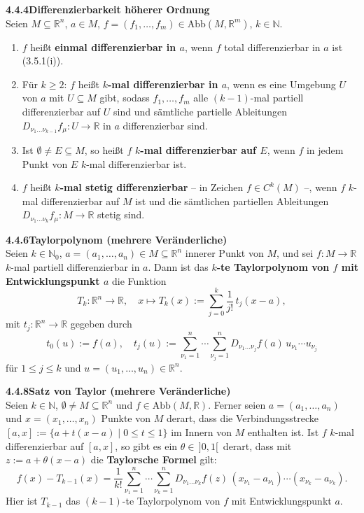 \documentclass[a4paper,12pt]{article}
\newcommand{\gentry}[3]{%
  \noindent\textbf{#1\quad #2}\nopagebreak\\[0.2em]
  #3\par\smallskip
}
\begin{document}
\gentry{4.4.4}{Differenzierbarkeit höherer Ordnung}{%
  Seien $M \subseteq \mathbb{R}^n$, $a \in M$, $f = (f_1, \ldots, f_m) \in \mathrm{Abb}(M, \mathbb{R}^m)$,
  $k \in \mathbb{N}$.
  \begin{enumerate}[label=(\roman*),topsep=2pt,itemsep=1pt]
    \item $f$ heißt \textbf{einmal differenzierbar in $a$}, wenn $f$ total differenzierbar in $a$
          ist (3.5.1(i)).
    \item Für $k \geq 2$: $f$ heißt \textbf{$k$-mal differenzierbar in $a$}, wenn es eine
          Umgebung $U$ von $a$ mit $U \subseteq M$ gibt, sodass $f_1, \ldots, f_m$ alle
          $(k-1)$-mal partiell differenzierbar auf $U$ sind und sämtliche partielle Ableitungen
          $D_{\nu_1 \ldots \nu_{k-1}} f_\mu: U \to \mathbb{R}$ in $a$ differenzierbar sind.
    \item Ist $\emptyset \neq E \subseteq M$, so heißt $f$ \textbf{$k$-mal differenzierbar auf $E$},
          wenn $f$ in jedem Punkt von $E$ $k$-mal differenzierbar ist.
    \item $f$ heißt \textbf{$k$-mal stetig differenzierbar} -- in Zeichen $f \in C^k(M)$ --,
          wenn $f$ $k$-mal differenzierbar auf $M$ ist und die sämtlichen partiellen Ableitungen
          $D_{\nu_1 \ldots \nu_k} f_\mu: M \to \mathbb{R}$ stetig sind.
  \end{enumerate}
}

\gentry{4.4.6}{Taylorpolynom (mehrere Veränderliche)}{%
  Seien $k \in \mathbb{N}_0$, $a = (a_1, \ldots, a_n) \in M \subseteq \mathbb{R}^n$ innerer Punkt
  von $M$, und sei $f: M \to \mathbb{R}$ $k$-mal partiell differenzierbar in $a$. Dann ist das
  \textbf{$k$-te Taylorpolynom von $f$ mit Entwicklungspunkt $a$} die Funktion
  \[
    T_k: \mathbb{R}^n \to \mathbb{R}, \quad x \mapsto T_k(x) := \sum_{j=0}^{k} \frac{1}{j!}\,t_j(x-a),
  \]
  mit $t_j: \mathbb{R}^n \to \mathbb{R}$ gegeben durch
  \[
    t_0(u) := f(a), \quad
    t_j(u) := \sum_{\nu_1=1}^{n} \cdots \sum_{\nu_j=1}^{n} D_{\nu_1 \ldots \nu_j} f(a)\,u_{\nu_1} \cdots u_{\nu_j}
  \]
  für $1 \leq j \leq k$ und $u = (u_1, \ldots, u_n) \in \mathbb{R}^n$.
}

\gentry{4.4.8}{Satz von Taylor (mehrere Veränderliche)}{%
  Seien $k \in \mathbb{N}$, $\emptyset \neq M \subseteq \mathbb{R}^n$ und $f \in \mathrm{Abb}(M, \mathbb{R})$.
  Ferner seien $a = (a_1, \ldots, a_n)$ und $x = (x_1, \ldots, x_n)$ Punkte von $M$ derart, dass
  die Verbindungsstrecke $[a, x] := \{a + t(x-a) \mid 0 \leq t \leq 1\}$ im Innern von $M$
  enthalten ist. Ist $f$ $k$-mal differenzierbar auf $[a, x]$, so gibt es ein $\theta \in \,]0, 1[\,$
  derart, dass mit $z := a + \theta(x-a)$ die \textbf{Taylorsche Formel} gilt:
  \[
    f(x) - T_{k-1}(x) = \frac{1}{k!} \sum_{\nu_1=1}^{n} \cdots \sum_{\nu_k=1}^{n}
    D_{\nu_1 \ldots \nu_k} f(z)\,(x_{\nu_1} - a_{\nu_1}) \cdots (x_{\nu_k} - a_{\nu_k}).
  \]
  Hier ist $T_{k-1}$ das $(k-1)$-te Taylorpolynom von $f$ mit Entwicklungspunkt $a$.
}
\end{document}
